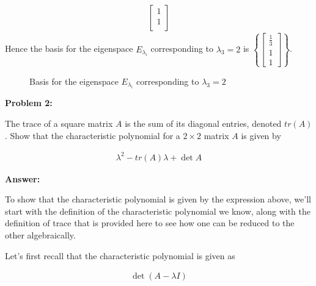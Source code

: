 \documentclass[10pt,letterpaper,final]{report}
\begin{document}
\begin{enumerate}[label=(\alph*)]
\begin{enumerate}[label=(\arabic*)]
\begin{align*}
\begin{bmatrix}
                                                         1           \\
                                                         1           \\
                                                       \end{bmatrix}
                \end{align*}
                Hence the basis for the eigenspace $E_{\lambda_i}$ corresponding to $\lambda_3 = 2$ is $\left\{\begin{bmatrix}\frac{1}{3}\\1\\1\end{bmatrix}\right\}$.
                \begin{figure}[H]
                  \centering
                  \caption{{Basis for the eigenspace $E_{\lambda_i}$ corresponding to $\lambda_3 = 2$}}
                \end{figure}
        \end{enumerate}
\end{enumerate}

\pagebreak

\noindent\textbf{Problem 2:}
\medskip

The trace of a square matrix $A$ is the sum of its diagonal entries, denoted $tr(A)$. Show that the characteristic polynomial for a $2 \times 2$ matrix $A$ is given by

\begin{align*}
  \lambda^2 - tr(A)\lambda + \det A
\end{align*}

\medskip
\noindent\textbf{Answer:}

To show that the characteristic polynomial is given by the expression above, we'll start with the definition of the characteristic polynomial we know, along with the definition of trace that is provided here to see how one can be reduced to the other algebraically.

Let's first recall that the characteristic polynomial is given as

\begin{align*}
  \det(A - \lambda I)
\end{align*}
\end{document}
